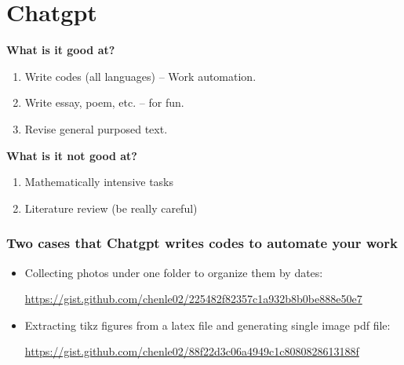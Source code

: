 \documentclass[9pt,table,xcolor=dvipsnames]{beamer}%
\theoremstyle{definition}
\theoremstyle{plain}
\begin{document}
\section{Chatgpt}
\begin{frame}[fragile] %

  \textbf{What is it good at?}

   \begin{enumerate}
     \item Write codes (all languages) -- Work automation.
     \item Write essay, poem, etc. -- for fun.
     \item Revise general purposed text.
   \end{enumerate}

  \vfill

  \textbf{What is it not good at?}

   \begin{enumerate}
     \item Mathematically intensive tasks
     \item Literature review (be really careful)
   \end{enumerate}

\end{frame}
\begin{frame}[fragile,t] %
  \frametitle{Two cases that Chatgpt writes codes to automate your work}

\begin{itemize}
  \item Collecting photos under one folder to organize them by dates: \bigskip

    \begin{center}
      \url{https://gist.github.com/chenle02/225482f82357c1a932b8b0be888e50e7}
    \end{center}

    \vfill

  \item Extracting tikz figures from a latex file and generating single image
    pdf file: \bigskip

    \begin{center}
      \url{https://gist.github.com/chenle02/88f22d3c06a4949c1c8080828613188f}
    \end{center}
\end{itemize}
\end{frame}
\end{document}
